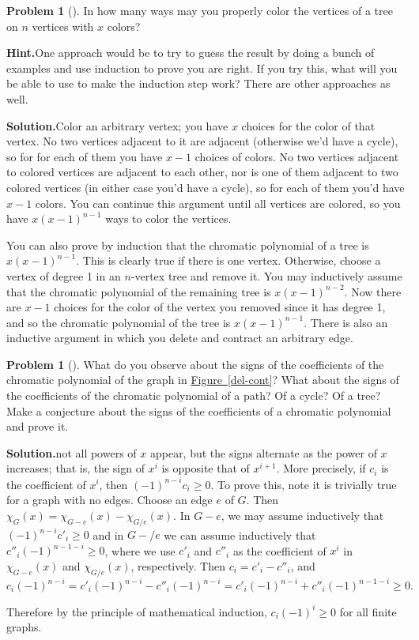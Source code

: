 \documentclass[10pt,]{book}
\theoremstyle{plain}
\theoremstyle{definition}
\newtheorem{activity}[project]{Problem}
\theoremstyle{definition}
\numberwithin{equation}{chapter}
\begin{document}
\begin{activity}[]\label{activity-246}
In how many ways may you properly color the vertices of a tree on \(n\) vertices with \(x\) colors?%
\par\medskip\noindent%
\textbf{Hint.}\quad One approach would be to try to guess the result by doing a bunch of examples and use induction to prove you are right. If you try this, what will you be able to use to make the induction step work? There are other approaches as well.%
\par\medskip\noindent%
\textbf{Solution.}\quad Color an arbitrary vertex; you have \(x\) choices for the color of that vertex. No two vertices adjacent to it are adjacent (otherwise we'd have a cycle), so for for each of them you have \(x-1\) choices of colors. No two vertices adjacent to colored vertices are adjacent to each other, nor is one of them adjacent to two colored vertices (in either case you'd have a cycle), so for each of them you'd have \(x-1\) colors. You can continue this argument until all vertices are colored, so you have \(x(x-1)^{n-1}\) ways to color the vertices.%
\par
You can also prove by induction that the chromatic polynomial of a tree is \(x(x-1)^{n-1}\). This is clearly true if there is one vertex. Otherwise, choose a vertex of degree 1 in an \(n\)-vertex tree and remove it. You may inductively assume that the chromatic polynomial of the remaining tree is \(x(x-1)^{n-2}\). Now there are \(x-1\) choices for the color of the vertex you removed since it has degree 1, and so the chromatic polynomial of the tree is \(x(x-1)^{n-1}\). There is also an inductive argument in which you delete and contract an arbitrary edge.%
\end{activity}
\begin{activity}[]\label{activity-247}
What do you observe about the signs of the coefficients of the chromatic polynomial of the graph in \hyperref[del-cont]{Figure~\ref{del-cont}}? What about the signs of the coefficients of the chromatic polynomial of a path? Of a cycle? Of a tree? Make a conjecture about the signs of the coefficients of a chromatic polynomial and prove it.%
\par\medskip\noindent%
\textbf{Solution.}\quad not all powers of \(x\) appear, but the signs alternate as the power of \(x\) increases; that is, the sign of \(x^i\) is opposite that of \(x^{i+1}\). More precisely, if \(c_i\) is the coefficient of \(x^i\), then \((-1)^{n-i}c_i\ge 0\). To prove this, note it is trivially true for a graph with no edges. Choose an edge \(e\) of \(G\). Then \(\chi_G(x) =
\chi_{G-e}(x)-\chi_{G/e}(x)\). In \(G-e\), we may assume inductively that \((-1)^{n-i}c'_i\ge0\) and in \(G-/e\) we can assume inductively that \(c''_i(-1)^{n-1-i}\ge0\), where we use \(c'_i\) and \(c''_i\) as the coefficient of \(x^i\) in \(\chi_{G-e}(x)\) and \(\chi_{G/e}(x)\), respectively. Then \(c_i=c'_i
-c''_i\), and%
\begin{equation*}
c_i(-1)^{n-i}=c'_i(-1)^{n-i}-c''_i(-1)^{n-i}=c'_i(-1)^{n-i}+c''_i(-1)^{n-1-i}
\ge0.
\end{equation*}
%
\par
Therefore by the principle of mathematical induction, \(c_i(-1)^i\ge0\) for all finite graphs.%
\end{activity}
\end{document}
